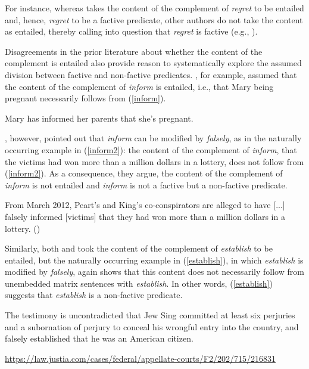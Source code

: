 \documentclass[11pt,fleqn]{article}
\newcommand{\6}{\mbox{$[\hspace*{-.6mm}[$}}
\newcommand{\9}{\mbox{$]\hspace*{-.6mm}]$}}
\begin{document}
\begin{itemize}
For instance, whereas \citet{abrusan2011,abrusan2016} takes the content of the complement of {\em regret} to be entailed and, hence, {\em regret} to be a factive predicate, other authors do not take the content as entailed, thereby calling into question that {\em regret} is factive (e.g., \citealt{klein1975,schlenker2003,egre2008}). 


Disagreements in the prior literature about whether the content of the complement is entailed also provide reason to systematically explore the assumed division between factive  and non-factive predicates. \citet[139]{schlenker10}, for example, assumed that the content of the complement of {\em inform} is entailed, i.e., that Mary being pregnant necessarily follows from (\ref{inform}).  

\begin{exe}
\ex\label{inform} Mary has informed her parents that she's pregnant.

\end{exe}
\citet[76]{anand-hacquard2014}, however, pointed out that {\em inform} can be modified by {\em falsely}, as in the naturally occurring example in (\ref{inform2}): the content of the complement of {\em inform}, that the victims had won more than a million dollars in a lottery, does not follow from (\ref{inform2}). As a consequence, they argue, the content of the complement of {\em inform}  is not entailed and {\em inform} is not a factive but a non-factive predicate.

\begin{exe}
\ex\label{inform2} From March 2012, Peart's and King's co-conspirators are alleged to have [...] falsely informed [victims] that they had won more than a million dollars in a lottery. \hfill (\citealt[76]{anand-hacquard2014})
\end{exe}
Similarly, both \citet{wyse} and \citet{swanson2012} took the content of the complement of {\em establish} to be entailed, but the naturally occurring example in (\ref{establish}), in which {\em establish} is  modified by {\em falsely}, again shows that this content does not necessarily follow from unembedded matrix sentences with {\em establish}. In other words, (\ref{establish}) suggests that {\em establish} is a non-factive predicate.

\begin{exe}
\ex\label{establish} The testimony is uncontradicted that Jew Sing committed at least six perjuries and a subornation of perjury to conceal his wrongful entry into the country, and falsely established that he was an American citizen. \hfill \begin{footnotesize}\url{https://law.justia.com/cases/federal/appellate-courts/F2/202/715/216831}\end{footnotesize}
\end{exe}


\end{itemize}
\end{document}
